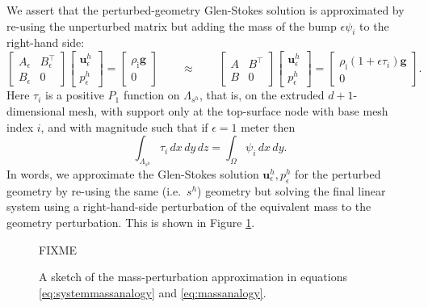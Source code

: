 \documentclass[letterpaper,final,12pt,reqno]{amsart}
\theoremstyle{claim}
\newcommand{\eps}{\epsilon}
\newcommand{\bg}{\mathbf{g}}
\newcommand{\bu}{\mathbf{u}}
\newcommand{\rhoi}{\rho_{\text{i}}}
\numberwithin{equation}{section}
\numberwithin{figure}{section}
\numberwithin{table}{section}
\numberwithin{theorem}{section}
\begin{document}
We assert that the perturbed-geometry Glen-Stokes solution is approximated by re-using the unperturbed matrix but adding the mass of the bump $\eps \psi_i$ to the right-hand side:
\begin{equation}
\begin{bmatrix} A_\eps & B_\eps^\top \\
                B_\eps & 0      \end{bmatrix}
\begin{bmatrix} \bu_\eps^h \\ p_\eps^h \end{bmatrix}
    = \begin{bmatrix} \rhoi \bg \\ 0 \end{bmatrix}
\qquad \approx \qquad
\begin{bmatrix} A & B^\top \\
                B & 0      \end{bmatrix}
\begin{bmatrix} \bu_\eps^h \\ p_\eps^h \end{bmatrix}
    = \begin{bmatrix}  \rhoi (1 + \eps \tau_i)\bg  \\ 0 \end{bmatrix}.  \label{eq:systemmassanalogy}
\end{equation}
Here $\tau_i$ is a positive $P_1$ function on $\Lambda_{s^h}$, that is, on the extruded $d+1$-dimensional mesh, with support only at the top-surface node with base mesh index $i$, and with magnitude such that if $\eps=1$ meter then
\begin{equation}
  \int_{\Lambda_{s^h}} \tau_i\,dx\,dy\,dz = \int_\Omega \psi_i\,dx\,dy . \label{eq:massanalogy}
\end{equation}
In words, we approximate the Glen-Stokes solution $\bu_\eps^h,p_\eps^h$ for the perturbed geometry by re-using the same (i.e.~$s^h$) geometry but solving the final linear system using a right-hand-side perturbation of the equivalent mass to the geometry perturbation.  This is shown in Figure \ref{fig:massanalogy}.

\begin{figure}[t]
\begin{center}
FIXME %
\end{center}
\caption{A sketch of the mass-perturbation approximation in equations \eqref{eq:systemmassanalogy} and \eqref{eq:massanalogy}.}
\label{fig:massanalogy}
\end{figure}
\end{document}
